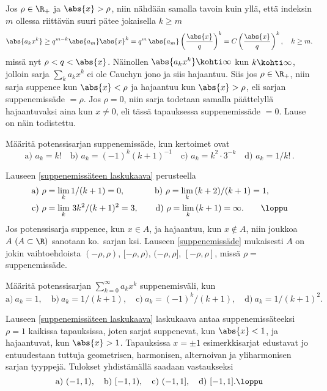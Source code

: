 Jos $\rho\in\R_+$ ja $\abs{x} > \rho$, niin nähdään samalla tavoin kuin yllä, että indeksin $m$
ollessa riittävän suuri pätee jokaisella $k \ge m$
\[
\abs{a_k x^k} \ge q^{m-k}\abs{a_m}\abs{x}^k = q^m\,\abs{a_m}\left(\frac{\abs{x}}{q}\right)^k 
                                            = C\left(\frac{\abs{x}}{q}\right)^k, \quad k \ge m.
\]
missä nyt $\rho < q < \abs{x}$. Näinollen $\abs{a_k x^k}\kohti \infty$ kun $k \kohti \infty$, 
jolloin sarja $\sum_k a_k x^k$ ei ole Cauchyn jono ja siis hajaantuu. Siis jos $\rho \in \R_+$,
niin sarja suppenee kun $\abs{x} < \rho$ ja hajaantuu kun $\abs{x} > \rho$, eli sarjan 
suppenemissäde $= \rho$. Jos $\rho = 0$, niin sarja todetaan samalla päättelyllä hajaantuvaksi
aina kun $x \neq 0$, eli tässä tapauksessa suppenemissäde $= 0$. Lause on näin todistettu. \loppu
\begin{Exa} Määritä potenssisarjan suppenemissäde, kun kertoimet ovat
\[
\text{a) } a_k=k!\quad \text{b) } a_k=(-1)^k (k+1)^{-1}\quad 
\text{c) } a_k=k^2\cdot 3^{-k}\quad \text{d) } a_k=1/k!\,.
\]
\end{Exa}
\ratk Lauseen \ref{suppenemissäteen laskukaava} perusteella
\begin{align*}
\text{a) } \rho &= \lim_k 1/(k+1) = 0, \qquad\quad\,\   
\text{b) } \rho = \lim_k\,(k+2)/(k+1) = 1, \\
\text{c) } \rho &= \lim_k\,3k^2/(k+1)^2 = 3, \qquad     
\text{d) } \rho = \lim_k\,(k+1) = \infty. \qquad\loppu
\end{align*}
Jos potenssisarja suppenee, kun $x \in A$, ja hajaantuu, kun $x \not\in A$, niin joukkoa 
$A\ (A\subset\R)$ sanotaan ko.\ sarjan \kor{suppenemisväli}ksi. Lauseen \ref{suppenemissäde}
mukaisesti $A$ on jokin vaihtoehdoista $(-\rho,\rho)$, $[-\rho,\rho)$, $(-\rho,\rho]$, 
$[-\rho,\rho]$, missä $\rho=$ suppenemissäde. 
\begin{Exa} \label{suppenemisvälejä} Määritä potenssisarjan  $\sum_{k=0}^\infty a_k x^k$ 
suppenemisväli, kun 
\[
\text{a)}\ a_k = 1, \quad \text{b)}\ a_k = 1/(k+1), \quad 
\text{c)}\ a_k = (-1)^k/(k+1), \quad \text{d)}\ a_k = 1/(k+1)^2.
\]
\end{Exa}
\ratk Lauseen \ref{suppenemissäteen laskukaava} laskukaava antaa suppenemissäteeksi $\rho = 1$
kaikissa tapauksissa, joten sarjat suppenevat, kun $\abs{x} < 1$, ja hajaantuvat, kun 
$\abs{x} > 1$. Tapauksissa $x = \pm 1$ esimerkkisarjat edustavat jo entuudestaan tuttuja 
geometrisen, harmonisen, alternoivan ja yliharmonisen sarjan tyyppejä. Tulokset yhdistämällä 
saadaan vastaukseksi
\[
\text{a)}\ (-1,1), \quad \text{b)}\ [-1,1), \quad \text{c)}\ (-1,1], 
\quad \text{d)}\ [-1,1]. \loppu
\]
